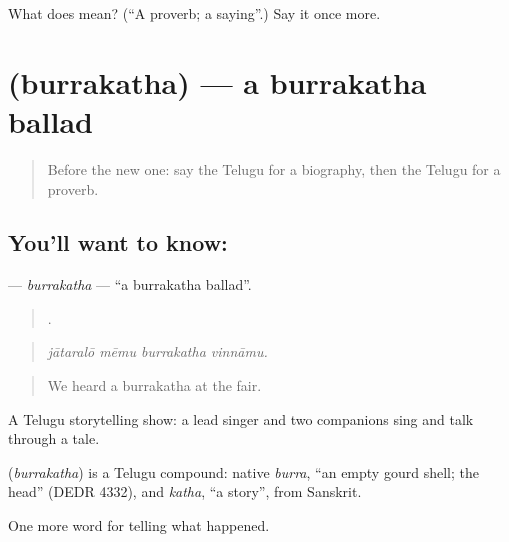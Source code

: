 \begin{tcolorbox}[breakable,colback=teal!4,colframe=teal!35!black,title={Before you move on}]
What does  mean? (\textquotedblleft{}A proverb; a saying\textquotedblright{}.) Say it once more.
\end{tcolorbox}
\section[\texorpdfstring{\te{బుర్రకథ} (burrakatha)}{బుర్రకథ (burrakatha)}]{ (burrakatha) — a burrakatha ballad}

\label{lesson:TE-C373-burrakatha}



\begin{quote}
Before the new one: say the Telugu for a biography, then the Telugu for a proverb.
\end{quote}

\subsection*{You'll want to know: }
\textbf{} — \emph{burrakatha} — \textquotedblleft{}a burrakatha ballad\textquotedblright{}.

\begin{quote}
   .
\end{quote}

\begin{quote}
\emph{jātaralō mēmu burrakatha vinnāmu.}
\end{quote}

\begin{quote}
We heard a burrakatha at the fair.
\end{quote}

A Telugu storytelling show: a lead singer and two companions sing and talk through a tale.

\begin{cousinweb}
\textbf{} (\emph{burrakatha}) is a Telugu compound: native \emph{burra}, \textquotedblleft{}an empty gourd shell; the head\textquotedblright{} (DEDR 4332), and \emph{katha}, \textquotedblleft{}a story\textquotedblright{}, from Sanskrit.
\end{cousinweb}

\begin{grammarlens}[title={What you've built}]
One more word for telling what happened.
\end{grammarlens}


